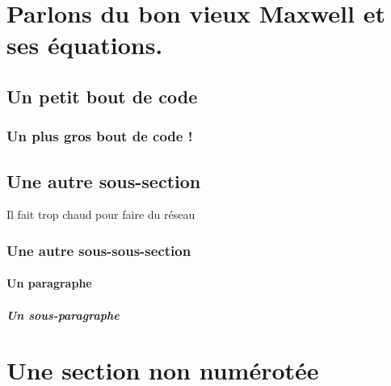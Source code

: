 \section{Parlons du bon vieux Maxwell et ses équations.}

\subsection{Un petit bout de code}


\subsubsection{Un plus gros bout de code !}

\subsection{Une autre sous-section}

Il fait trop chaud pour faire du réseau
\subsubsection{Une autre sous-sous-section}
\paragraph{Un paragraphe}
\subparagraph{Un sous-paragraphe}
\section*{Une section non numérotée}
